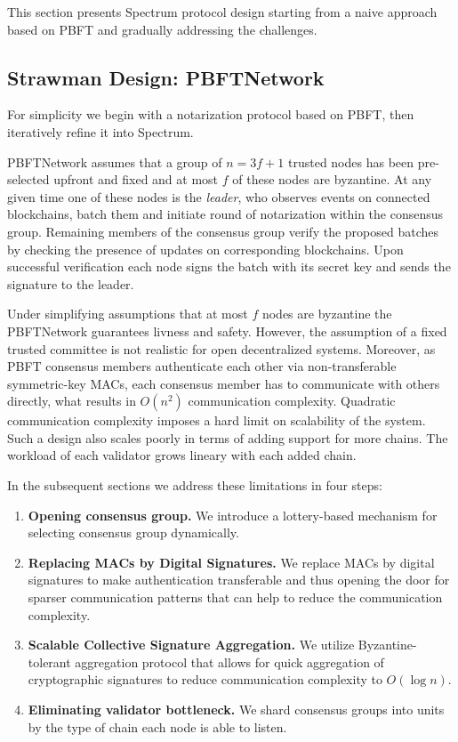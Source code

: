 This section presents Spectrum protocol design starting from a naive approach based on PBFT and gradually addressing the challenges.

\subsection{Strawman Design: PBFTNetwork}\label{subsec:strawman-design}

For simplicity we begin with a notarization protocol based on PBFT, then iteratively refine it into Spectrum.

PBFTNetwork assumes that a group of ${n = 3f + 1}$ trusted nodes has been pre-selected upfront and fixed and at most $f$ of these nodes are byzantine.
At any given time one of these nodes is the \emph{leader}, who observes events on connected blockchains,
batch them and initiate round of notarization within the consensus group.
Remaining members of the consensus group verify the proposed batches by checking the presence of updates on corresponding blockchains.
Upon successful verification each node signs the batch with its secret key and sends the signature to the leader.

Under simplifying assumptions that at most $f$ nodes are byzantine the PBFTNetwork guarantees livness and safety.
However, the assumption of a fixed trusted committee is not realistic for open decentralized systems.
Moreover, as PBFT consensus members authenticate each other via non-transferable symmetric-key MACs, each consensus
member has to communicate with others directly, what results in $O(n^2)$ communication complexity.
Quadratic communication complexity imposes a hard limit on scalability of the system.
Such a design also scales poorly in terms of adding support for more chains.
The workload of each validator grows lineary with each added chain.

In the subsequent sections we address these limitations in four steps:
\begin{enumerate}
    \item \textbf{Opening consensus group.} We introduce a lottery-based mechanism for selecting consensus group dynamically.
    \item \textbf{Replacing MACs by Digital Signatures.} We replace MACs by digital signatures to make authentication transferable
    and thus opening the door for sparser communication patterns that can help to reduce the communication complexity.
    \item \textbf{Scalable Collective Signature Aggregation.} We utilize Byzantine-tolerant aggregation protocol that allows for
    quick aggregation of cryptographic signatures to reduce communication complexity to $O(\log n)$.
    \item \textbf{Eliminating validator bottleneck.} We shard consensus groups into units by the type of chain each node is able to listen.
\end{enumerate}

